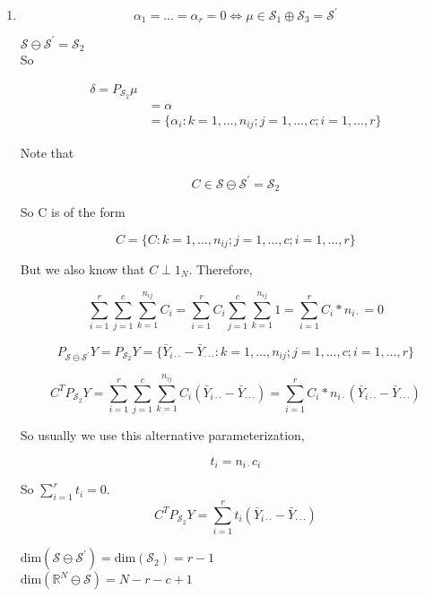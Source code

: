 \documentclass[11pt,fleqn]{book} %
\begin{document}
	\begin{enumerate}[label = \Roman*]
		\item $$\alpha_1 = \dots = \alpha _r = 0 \Leftrightarrow \mu \in \mathcal{S}_1 \oplus \mathcal{S}_3 = \mathcal{S}^\prime$$

		$\mathcal{S} \ominus \mathcal{S}^\prime = \mathcal{S}_2$\\

So 

		\begin{align*}
			\delta = P_{\mathcal{S}_2}\mu\\
				&= \alpha \\
				&= \{\alpha_i: k = 1, \dots, n_{ij}; j = 1, \dots, c; i = 1, \dots, r \}
		\end{align*}


Note that

		$$C \in \mathcal{S} \ominus \mathcal{S}^\prime = \mathcal{S}_2 $$

So C is of the form

		$$C = \{C: k = 1, \dots, n_{ij}; j = 1, \dots, c; i = 1, \dots, r \} $$

But we also know that $C \perp 1_N$. Therefore, 


		$$\displaystyle \sum^r_{i=1} \sum^c_{j=1} \sum^{n_{ij}}_{k=1}  C_i =\displaystyle \sum^r_{i=1} C_i \sum^c_{j=1} \sum^{n_{ij}}_{k=1}  1 =  \sum^r_{i=1} C_i * n_{i\cdot} = 0$$

		$$P_{\mathcal{S} \ominus \mathcal{S}^\prime} Y =  P_{\mathcal{S}_2} Y = \{\bar{Y}_{i\cdot \cdot} - \bar{Y}_{\cdot \cdot \cdot}: k = 1, \dots, n_{ij}; j = 1, \dots, c; i = 1, \dots, r  \}$$ 


		$$C^T P_{\mathcal{S}_2}Y = \displaystyle \sum^r_{i=1} \sum^c_{j=1} \sum^{n_{ij}}_{k=1}  C_i (\bar{Y}_{i\cdot \cdot} - \bar{Y}_{\cdot \cdot \cdot})  =\sum^r_{i=1} C_i * n_{i\cdot} (\bar{Y}_{i\cdot \cdot} - \bar{Y}_{\cdot \cdot \cdot}) $$

So usually we use this alternative parameterization, 

		$$t_i = n_{i\cdot} c_i$$


So $\displaystyle \sum^r_{i=1} t_i = 0$.\\

		$$ C^T P_{\mathcal{S}_2}Y = \displaystyle \sum^r_{i=1} t_i (\bar{Y}_{i\cdot \cdot} - \bar{Y}_{\cdot \cdot \cdot})$$


$\text{dim}(\mathcal{S} \ominus \mathcal{S}^\prime) = \text{dim}(\mathcal{S}_2) = r - 1$\\
$\text{dim}(\mathbb{R}^N \ominus \mathcal{S}) = N -r - c + 1$\\


\end{enumerate}
\end{document}
